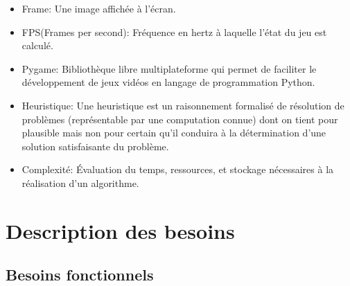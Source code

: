 \documentclass[french]{article}
\begin{document}
\begin{itemize}
    \item Frame: Une image affichée à l'écran.\newline 
    
    \item FPS(Frames per second): Fréquence en hertz à laquelle l'état du jeu est calculé.
    \newline
    \item Pygame: Bibliothèque libre multiplateforme qui permet de faciliter le développement de jeux vidéos en langage de programmation Python.
    \newline
    \item Heuristique: Une heuristique est un raisonnement formalisé de résolution de problèmes (représentable par une computation connue) dont on tient pour plausible mais non pour certain qu’il conduira à la détermination d’une solution satisfaisante du problème.
    \newline
    \item Complexité: Évaluation du temps, ressources, et stockage nécessaires à la réalisation d'un algorithme.
    

\end{itemize}{}


\section{Description des besoins}

\subsection{Besoins fonctionnels}
\end{document}
